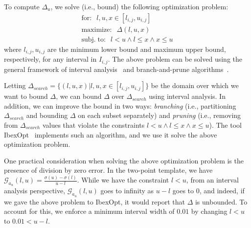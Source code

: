 To compute $ \Delta_u $, we solve (i.e., bound) the following optimization
problem:
\begin{gather*}\label{offlinesyn:eq:opt}
\mathrm{for:}\;\; l, u, x \in [l_{i,j}, u_{i,j}] \\
\mathrm{maximize:}\;\; \Delta(l, u, x)\\
\mathrm{subj. \; to:}\;\;
l < u \wedge l \leq x \wedge x \leq u
\end{gather*}
where $ l_{i,j}, u_{i,j} $ are the minimum lower bound and maximum upper bound,
respectively, for any interval in $ I_{i, j} $.
The above problem can be solved using the general framework of interval
analysis~\cite{moore2009introduction} and branch-and-prune
algorithms~\cite{benhamou2006continuous}.

Letting
$ \Delta_{search} = \{(l, u, x) | l, u, x \in [l_{i,j}, u_{i,j}] \} $
be the domain over which we want to bound $ \Delta $,
we can bound $ \Delta $ over $ \Delta_{search} $ using interval analysis.
%
In
addition, we can improve the bound in two ways: \textit{branching} (i.e.,
partitioning $ \Delta_{search} $ and bounding $ \Delta $ on each subset
separately) and \textit{pruning} (i.e., removing from $ \Delta_{search} $
values that violate the constraints $ l < u \wedge l \leq x \wedge x \leq u $).
The tool IbexOpt~\cite{chabert2009contractor} implements such an algorithm, and
we use it solve the above optimization problem.

One practical consideration when solving the above optimization problem is the
presence of division by zero error. In the two-point template, we have
$ \mathcal{G}_{a_u}(l, u) = \frac{\sigma(u) - \sigma(l)}{u - l} $. While we
have the
constraint $ l < u $, from an interval analysis perspective, $
\mathcal{G}_{a_u}(l, u) $ goes
to infinity as $ u - l $ goes to 0, and indeed, if we gave the above problem to
IbexOpt, it would report that $ \Delta $ is unbounded. To account for this, we
enforce a minimum interval width of $ 0.01 $ by changing $ l < u $ to $ 0.01 <
u - l $.

